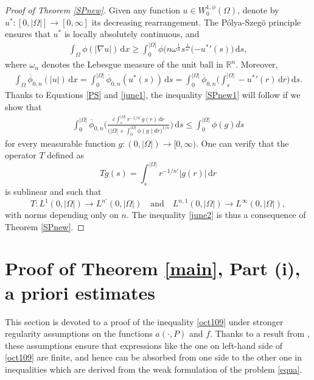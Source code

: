 \documentclass[leqno,11pt]{amsart}%
\numberwithin{equation}{section}
\def\Rn{{\mathbb R}^{n}}
\def\rn{\Rn}
\def\d{\mathrm{d}}
\def\dx{\d x}
\theoremstyle{definition}
\numberwithin{equation}{section}
\begin{document}
\begin{proof}
    [Proof of Theorem \ref{SPnew}] 
Given any function $u \in W^{1,\phi}_0(\Omega)$, denote by $u^*: [0,|\Omega|]\to [0,\infty] $ its decreasing rearrangement. The P\'olya-Szeg\"o principle ensures that $u^*$ is locally absolutely continuous, and 
\begin{align}
    \label{PS}
    \int_{\Omega}\phi(|\nabla u|)\, \dx \geq \int_0^{|\Omega|}\phi\big({ n\omega^{\frac1n}}s^{\frac{1}{n'}}(-{u^*}'(s)\big)\, \d s,
\end{align}
where $\omega_n$ denotes the Lebesgue measure of the unit ball in $\rn$. Moreover,
\begin{align}
    \label{june1}
    \int_\Omega {\overline{\phi}_{0,n}}(|u|)\, \d x = \int_0^{|\Omega|}{\overline{\phi}_{0,n}}(u^*(s))\, \d s= \int_0^{|\Omega|}\overline{\phi}_{0,n}\bigg(\int_s^{|\Omega|}-{u^*}'(r)\,\d r \bigg)\, \d s.
\end{align}
Thanks to Equations \eqref{PS} and \eqref{june1}, the inequality \eqref{SPnew1} will follow if we show that
\begin{align}
    \label{june2}
\int_0^{|\Omega|}\overline{\phi}_{0,n}\Bigg(\frac{c\int_s^{|\Omega|}r^{-1/n'}g(r)\,\d r}{\big(|\Omega|+ \int_0^{|\Omega|}\phi(g)dr\big)^{1/n}} \Bigg)\, \d s \leq \int_0^{|\Omega|}\phi(g)ds
\end{align}
for every measurable function $g: (0, |\Omega|) \to [0, \infty)$. One can verify that the operator $T$ defined as 
$$Tg(s) = \int_s^{|\Omega|}r^{-1/n'}|g(r)|\,\d r $$
is sublinear and such that
$$T: L^1(0, |\Omega|) \to L^{n'}(0, |\Omega|) \quad \text{and} \quad  L^{n,1}(0, |\Omega|) \to L^{\infty}(0, |\Omega|),
$$
with norms depending only on $n$. The inequality \eqref{june2} is thus a consequence of Theorem \ref{SPnew}.
\end{proof}


\section{Proof of Theorem \ref{main}, Part (i), a priori estimates}\label{sec:proof1}

  This section is devoted to a proof of the inequality \eqref{oct109} under stronger regularity assumptions on the functions $a(\cdot, P)$ and $f$. Thanks to a result from \cite{GPS}, these assumptions ensure that expressions like the one on left-hand side of \eqref{oct109} are finite, and hence  can be absorbed from one side to the other one in inequalities which are derived from the weak formulation of the problem \eqref{equa}.
\end{document}
